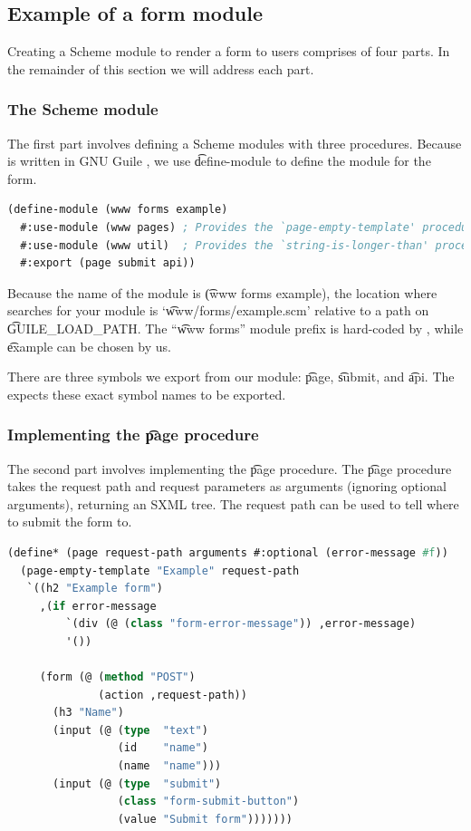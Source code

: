 \subsection{Example of a form module}

  Creating a Scheme module to render a form to users comprises of four
  parts.  In the remainder of this section we will address each part.

\subsubsection{The Scheme module}
\label{sec:scheme-module}

  The first part involves defining a Scheme modules with three procedures.
  Because  is written in GNU Guile \citep{guile},
  we use \t{define-module} to define the module for the form.

\begin{lstlisting}[language=Lisp]
(define-module (www forms example)
  #:use-module (www pages) ; Provides the `page-empty-template' procedure.
  #:use-module (www util)  ; Provides the `string-is-longer-than' procedure.
  #:export (page submit api))
\end{lstlisting}

  Because the name of the module is \t{(www forms example)}, the location
  where  searches for your module is `\t{www/forms/example.scm}'
  relative to a path on \t{GUILE\_LOAD\_PATH}.  The ``\t{www forms}'' module
  prefix is hard-coded by , while \t{example} can be chosen by
  us.

  There are three symbols we export from our module: \t{page}, \t{submit}, and
  \t{api}.  The  expects these exact symbol names to be
  exported.

\subsubsection{Implementing the \t{page} procedure}

  The second part involves implementing the \t{page} procedure. The \t{page}
  procedure takes the request path and request parameters as arguments
  (ignoring optional arguments), returning an SXML tree.  The request path
  can be used to tell where to submit the form to.

\begin{lstlisting}[language=Lisp]
(define* (page request-path arguments #:optional (error-message #f))
  (page-empty-template "Example" request-path
   `((h2 "Example form")
     ,(if error-message
         `(div (@ (class "form-error-message")) ,error-message)
         '())

     (form (@ (method "POST")
              (action ,request-path))
       (h3 "Name")
       (input (@ (type  "text")
                 (id    "name")
                 (name  "name")))
       (input (@ (type  "submit")
                 (class "form-submit-button")
                 (value "Submit form")))))))
\end{lstlisting}

